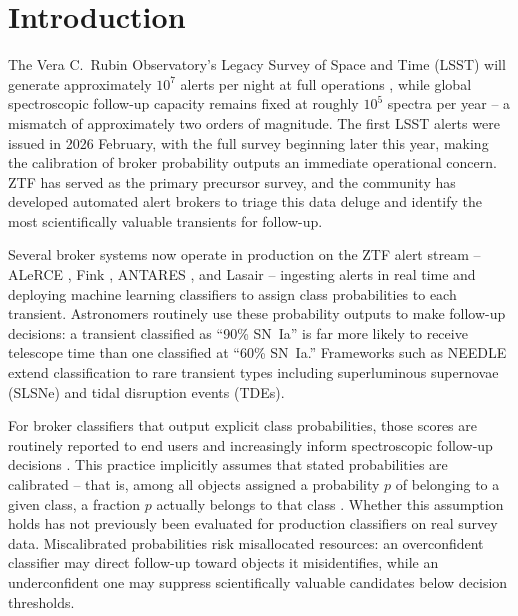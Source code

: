 \documentclass[a4paper,fleqn,usenatbib]{mnras}
\begin{document}
\section{Introduction} \label{sec:intro}

The Vera C.~Rubin Observatory's Legacy Survey of Space and Time
(LSST) will generate approximately $10^7$ alerts per night at full
operations \citep{ivezic2019}, while global spectroscopic follow-up
capacity remains fixed at roughly $10^5$ spectra per year -- a mismatch
of approximately two orders of magnitude. The first LSST alerts were
issued in 2026 February, with the full survey beginning later this
year, making the calibration of broker probability outputs an immediate
operational concern. ZTF \citep{bellm2019} has served as the primary
precursor survey, and the community has developed automated alert
brokers to triage this data deluge and identify the most scientifically
valuable transients for follow-up.

Several broker systems now operate in production on the ZTF alert
stream -- ALeRCE \citep{forster2021}, Fink \citep{moller2021}, ANTARES
\citep{narayan2018}, and Lasair \citep{smith2019} -- ingesting alerts in
real time and deploying machine learning classifiers to assign class
probabilities to each transient. Astronomers routinely use these
probability outputs to make follow-up decisions: a transient classified
as ``90\% SN~Ia'' is far more likely to receive telescope time than one
classified at ``60\% SN~Ia.'' Frameworks such as NEEDLE \citep{sheng2024}
extend classification to rare transient types including superluminous
supernovae (SLSNe) and tidal disruption events (TDEs).

For broker classifiers that output explicit class probabilities, those
scores are routinely reported to end users and increasingly inform
spectroscopic follow-up decisions \citep{forster2021, moller2021,
sheng2024}. This practice implicitly assumes that stated probabilities
are calibrated -- that is, among all objects assigned a probability $p$
of belonging to a given class, a fraction $p$ actually belongs to that
class \citep{dawid1982}. Whether this assumption holds has not previously
been evaluated for production classifiers on real survey data.
Miscalibrated probabilities risk misallocated resources: an overconfident
classifier may direct follow-up toward objects it misidentifies, while an
underconfident one may suppress scientifically valuable candidates below
decision thresholds.
\end{document}
